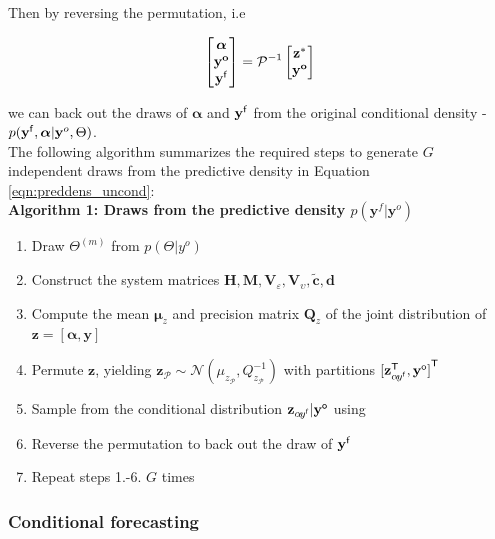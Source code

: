 \documentclass[notitlepage,a4paper,12pt]{article}
\newcommand{\transpose}[1]{{#1}^{\sf{T}}}
\begin{document}
Then by reversing the permutation, i.e 

$$
\begin{bmatrix}
    \boldsymbol{\alpha} \\
    \mathbf{y^{o}} \\
    \mathbf{y^{\sf{f}}}
\end{bmatrix}
= 
\mathcal{P}^{-1} 
\begin{bmatrix}
    \mathbf{z}^*\\
    \mathbf{y^{o}}
\end{bmatrix}
$$

we can back out the draws of $\boldsymbol{\alpha}$ and $\mathbf{y}^{\sf{f}}$ from the original conditional density - $p(\mathbf{y}^{\sf{f}},\boldsymbol{\alpha} | \mathbf{y}^{o},\Theta)$.\\

The following algorithm summarizes the required steps to generate $G$ independent draws from the predictive density in Equation \ref{eqn:preddens_uncond}:\\

 \noindent\textbf{Algorithm 1: Draws from the predictive density $p(\mathbf{y}^f | \mathbf{y}^o)$}

\begin{enumerate}
    \item Draw $\Theta^{(m)}$ from $p(\Theta | y^o)$
    \item Construct the system matrices $\mathbf{H}, \mathbf{M}, \mathbf{V}_{\!\varepsilon}, \mathbf{V}_{\!\upsilon}, \tilde{\mathbf{c}}, \mathbf{d}$
    \item Compute the mean $\boldsymbol{\mu}_{z}$ and precision matrix $\mathbf{Q}_{z}$ of the joint distribution of $\mathbf{z} = [\boldsymbol{\alpha}, \mathbf{y}]$  
    \item Permute $\mathbf{z}$, yielding $\mathbf{z}_{\mathcal{P}} \sim \mathcal{N}(\mu_{z_\mathcal{P}}, Q_{z_\mathcal{P}}^{-1})$ with partitions $\transpose{[\mathbf{z}^{\sf{T}}_{\alpha\! y^{\sf{f}}}, \mathbf{y}^{\sf{o}}]}$
    \item Sample from the conditional distribution $\mathbf{z}_{\alpha\! y^{\sf{f}}} | \mathbf{y}^{\sf{o}}$ using \citep[][Algorithm 2.1 and 2.4]{rueheld_2005}
    \item Reverse the permutation to back out the draw of $\mathbf{y}^{\sf{f}}$
    \item Repeat steps 1.-6. $G$ times
\end{enumerate}


\subsubsection{Conditional forecasting}\label{sec:condfcast}
\end{document}
